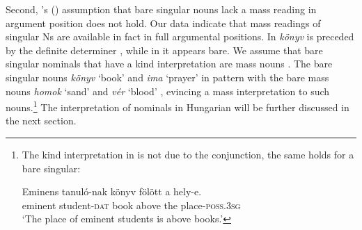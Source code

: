 \documentclass[output=paper]{langscibook}
\begin{document}
\ea \label{schv-nem:ex:33}
  \label{schv-nem:ex:33a}
 \label{schv-nem:ex:33b}  
 \label{schv-nem:ex:33c}
  \label{schv-nem:ex:33d}
\z
\z

\noindent Second, \citeauthor{erbach-etal-19}’s (\citeyear{erbach-etal-19}) assumption that bare singular nouns lack a mass reading in argument position does not hold. Our data indicate that mass readings of singular Ns are available in fact in full argumental positions. In  \textit{könyv} is preceded by the definite determiner , while in  it appears bare. We assume that bare singular nominals that have a kind interpretation are mass nouns \citep{chierchia-98b}. The bare singular nouns \textit{könyv} `book' and \textit{ima} `prayer' in  pattern with the bare mass nouns \textit{homok} `sand' and \textit{vér} `blood' , evincing a mass interpretation to such nouns.\footnote{The kind interpretation in  is not due to the conjunction, the same holds for a bare singular:

\ea
\gll Eminens tanuló-nak könyv fölött a hely-e. \\
eminent student-\textsc{dat} book above the place-\textsc{poss}.\textsc{3sg} \\
\glt `The place of eminent students is above books.'
\z
} The interpretation of nominals in Hungarian will be further discussed in the next section.\largerpage
\end{document}
